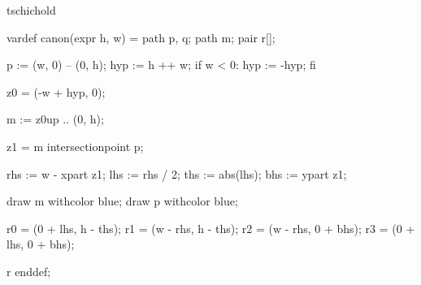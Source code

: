


\startenvironment tschichold

	\setuppagenumbering[alternative=doublesided]

	\startMPdefinitions
		vardef canon(expr h, w) =
			path p, q;
			path m;
			pair r[];

			p := (w, 0) -- (0, h); %
			hyp := h ++ w; %
			if w < 0:
				hyp := -hyp;
			fi

			z0 = (-w + hyp, 0); %

			m := z0{up} .. (0, h);

			z1 = m intersectionpoint p;

			rhs := w - xpart z1;
			lhs := rhs / 2;
			ths := abs(lhs); %
			bhs := ypart z1;

			draw m withcolor blue;
			draw p withcolor blue;

			r0 = (0 + lhs, h - ths); %
			r1 = (w - rhs, h - ths); %
			r2 = (w - rhs, 0 + bhs); %
			r3 = (0 + lhs, 0 + bhs); %

			r
		enddef;
	\stopMPdefinitions

\stopenvironment


